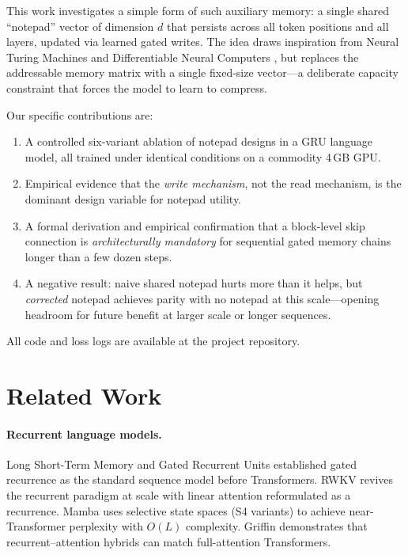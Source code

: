 \documentclass[11pt,a4paper]{article}
\begin{document}
This work investigates a simple form of such auxiliary memory: a single
shared ``notepad'' vector of dimension $d$ that persists across all token
positions and all layers, updated via learned gated writes.  The idea draws
inspiration from Neural Turing Machines \cite{graves2014neural} and
Differentiable Neural Computers \cite{graves2016hybrid}, but replaces the
addressable memory matrix with a single fixed-size vector---a deliberate
capacity constraint that forces the model to learn to compress.

Our specific contributions are:
\begin{enumerate}
  \item A controlled six-variant ablation of notepad designs in a GRU
        language model, all trained under identical conditions on a
        commodity 4\,GB GPU.
  \item Empirical evidence that the \emph{write mechanism}, not the read
        mechanism, is the dominant design variable for notepad utility.
  \item A formal derivation and empirical confirmation that a block-level
        skip connection is \emph{architecturally mandatory} for sequential
        gated memory chains longer than a few dozen steps.
  \item A negative result: naive shared notepad hurts more than it helps,
        but \emph{corrected} notepad achieves parity with no notepad at
        this scale---opening headroom for future benefit at larger scale or
        longer sequences.
\end{enumerate}

All code and loss logs are available at the project repository.

\section{Related Work}
\label{sec:related}

\paragraph{Recurrent language models.}
Long Short-Term Memory \cite{hochreiter1997lstm} and Gated Recurrent Units
\cite{cho2014learning} established gated recurrence as the standard
sequence model before Transformers.  RWKV \cite{peng2023rwkv} revives the
recurrent paradigm at scale with linear attention reformulated as a
recurrence.  Mamba \cite{gu2023mamba} uses selective state spaces (S4
variants) to achieve near-Transformer perplexity with $O(L)$ complexity.
Griffin \cite{de2024griffin} demonstrates that recurrent--attention
hybrids can match full-attention Transformers.
\end{document}
